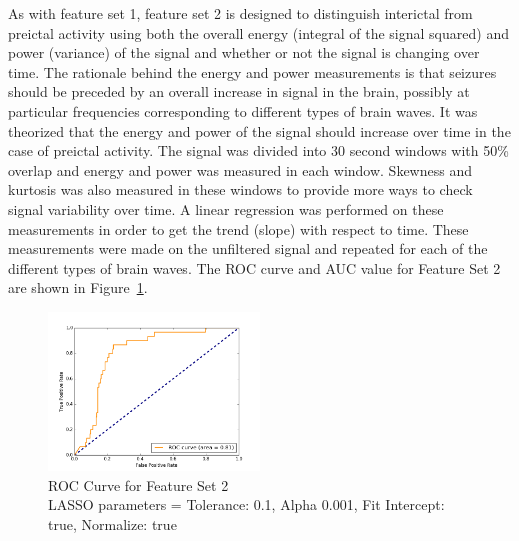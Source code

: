 \documentclass[10pt, conference, compsocconf]{IEEEtran}
\begin{document}
As with feature set 1, feature set 2 is designed to distinguish interictal from
preictal activity using both the overall energy (integral of the signal squared)
and power (variance) of the signal and whether or not the signal is changing
over time. The rationale behind the energy and power measurements is that
seizures should be preceded by an overall increase in signal in the brain,
possibly at particular frequencies corresponding to different types of brain
waves. It was theorized that the energy and power of the signal should increase
over time in the case of preictal activity. The signal was divided into 30
second windows with 50\% overlap and energy and power was measured in each
window. Skewness and kurtosis was also measured in these windows to provide more
ways to check signal variability over time. A linear regression was performed on
these measurements in order to get the trend (slope) with respect to time.
These measurements were made on the unfiltered signal and repeated for each of
the different types of brain waves. The ROC curve and AUC value for Feature Set
2 are shown in Figure~\ref{fig:ROC2}.
\begin{figure}[t]
\centering
  \includegraphics[width=0.5\textwidth]{fig/image05.png}  
    \caption{ROC Curve for Feature Set 2\\LASSO parameters = Tolerance: 0.1, Alpha 0.001, Fit Intercept:
    true, Normalize: true}
   \label{fig:ROC2}
\end{figure}
\end{document}
